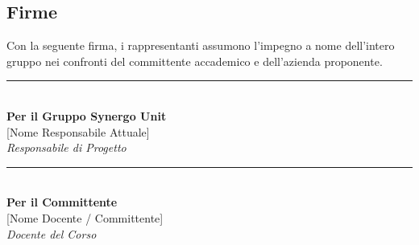\documentclass[11pt, a4paper]{article}
\begin{document}
	\vspace{2cm}
	
	\subsection{Firme}
	Con la seguente firma, i rappresentanti assumono l'impegno a nome dell'intero gruppo nei confronti del committente accademico e dell'azienda proponente.
	
	\vspace{2cm}
	
	\noindent
	\begin{minipage}[c]{0.45\textwidth}
		\begin{center}
			\rule{6cm}{0.4pt} \\ 
			\vspace{0.2cm}
			\textbf{Per il Gruppo Synergo Unit} \\
			{[Nome Responsabile Attuale]} \\
			\textit{Responsabile di Progetto}
		\end{center}
	\end{minipage}
	\hfill
	\begin{minipage}[c]{0.45\textwidth}
		\begin{center}
			\rule{6cm}{0.4pt} \\ 
			\vspace{0.2cm}
			\textbf{Per il Committente} \\
			{[Nome Docente / Committente]} \\
			\textit{Docente del Corso}
		\end{center}
	\end{minipage}
	
\end{document}
